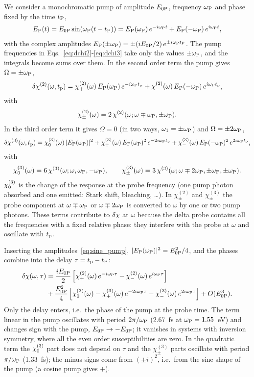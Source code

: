 \documentclass[10pt,a4paper]{paper}
\begin{document}
We consider a monochromatic pump of amplitude $E_{0\mathrm{P}}$, frequency $\omega_{\mathrm{P}}$ and phase fixed by the time $t_{\mathrm{P}}$,
\begin{equation}
E_{\mathrm{P}}(t) = E_{0\mathrm{P}}\sin(\omega_{\mathrm{P}}(t-t_{\mathrm{P}})) = E_{\mathrm{P}}(\omega_{\mathrm{P}})\,e^{-i\omega_{\mathrm{P}} t}+E_{\mathrm{P}}(-\omega_{\mathrm{P}})\,e^{i\omega_{\mathrm{P}} t} ,
\label{eq:sine_pump}
\end{equation}
with the complex amplitudes $E_{\mathrm{P}}(\pm\omega_{\mathrm{P}}) = \pm(iE_{0\mathrm{P}}/2)\,e^{\pm i\omega_{\mathrm{P}}t_{\mathrm{P}}}$. The pump frequencies in Eqs.~\eqref{eq:dchi2}-\eqref{eq:dchi3} take only the values $\pm\omega_{\mathrm{P}}$, and the integrals become
sums over them. In the second order term the pump gives $\Omega = \pm\omega_{\mathrm{P}}$,
\begin{equation}
\delta\chi^{(2)}(\omega,t_{\mathrm{p}}) = \chi^{(2)}_+(\omega)\,E_{\mathrm{P}}(\omega_{\mathrm{P}})\,e^{-i\omega_{\mathrm{P}}t_{\mathrm{p}}} + \chi^{(2)}_-(\omega)\,E_{\mathrm{P}}(-\omega_{\mathrm{P}})\,e^{i\omega_{\mathrm{P}}t_{\mathrm{p}}} ,
\label{eq:dchi2_mono}
\end{equation}
with
\begin{equation}
\chi^{(2)}_\pm(\omega) = 2\,\chi^{(2)}(\omega;\omega\mp\omega_{\mathrm{P}},\pm\omega_{\mathrm{P}}) .
\label{eq:chi2_mono}
\end{equation}
In the third order term it gives $\Omega = 0$ (in two ways, $\omega_1 = \pm\omega_{\mathrm{P}}$) and $\Omega = \pm2\omega_{\mathrm{P}}$,
\begin{equation}
\delta\chi^{(3)}(\omega,t_{\mathrm{p}}) = \chi^{(3)}_{0}(\omega)\,|E_{\mathrm{P}}(\omega_{\mathrm{P}})|^2 + \chi^{(3)}_{+}(\omega)\,E_{\mathrm{P}}(\omega_{\mathrm{P}})^2\,e^{-2i\omega_{\mathrm{P}}t_{\mathrm{p}}}
+ \chi^{(3)}_{-}(\omega)\,E_{\mathrm{P}}(-\omega_{\mathrm{P}})^2\,e^{2i\omega_{\mathrm{P}}t_{\mathrm{p}}} ,
\label{eq:dchi3_mono}
\end{equation}
with
\begin{equation}
\chi^{(3)}_{0}(\omega) = 6\,\chi^{(3)}(\omega;\omega,\omega_{\mathrm{P}},-\omega_{\mathrm{P}}) , \qquad
\chi^{(3)}_{\pm}(\omega) = 3\,\chi^{(3)}(\omega;\omega\mp2\omega_{\mathrm{P}},\pm\omega_{\mathrm{P}},\pm\omega_{\mathrm{P}}) .
\label{eq:chi3_mono}
\end{equation}
$\chi^{(3)}_{0}$ is the change of the response at the probe frequency (one pump photon absorbed and one emitted: Stark shift,
bleaching, \dots). In $\chi^{(2)}_\pm$ and $\chi^{(3)}_\pm$ the probe component at $\omega\mp\omega_{\mathrm{P}}$ or $\omega\mp2\omega_{\mathrm{P}}$ is
converted to $\omega$ by one or two pump photons. These terms contribute to $\delta\chi$ at $\omega$ because the delta probe
contains all the frequencies with a fixed relative phase: they interfere with the probe at $\omega$ and oscillate with
$t_{\mathrm{p}}$.

Inserting the amplitudes~\eqref{eq:sine_pump}, $|E_{\mathrm{P}}(\omega_{\mathrm{P}})|^2 = E_{0\mathrm{P}}^2/4$, and the phases combine into the delay
$\tau = t_{\mathrm{p}}-t_{\mathrm{P}}$:
\begin{align}
\delta\chi(\omega,\tau) &= \frac{iE_{0\mathrm{P}}}{2}\left[\chi^{(2)}_+(\omega)\,e^{-i\omega_{\mathrm{P}}\tau} - \chi^{(2)}_-(\omega)\,e^{i\omega_{\mathrm{P}}\tau}\right]
\nonumber\\
&+ \frac{E_{0\mathrm{P}}^2}{4}\left[\chi^{(3)}_{0}(\omega) - \chi^{(3)}_{+}(\omega)\,e^{-2i\omega_{\mathrm{P}}\tau} - \chi^{(3)}_{-}(\omega)\,e^{2i\omega_{\mathrm{P}}\tau}\right]
+ O(E_{0\mathrm{P}}^3) .
\label{eq:dchi_mono}
\end{align}
Only the delay enters, i.e.\ the phase of the pump at the probe time. The term linear in the pump oscillates with
period $2\pi/\omega_{\mathrm{P}}$ (2.67~fs at $\omega_{\mathrm{P}} = 1.55$~eV) and changes sign with the pump, $E_{0\mathrm{P}}\to-E_{0\mathrm{P}}$; it vanishes in systems
with inversion symmetry, where all the even order susceptibilities are zero. In the quadratic term the $\chi^{(3)}_{0}$ part does
not depend on $\tau$ and the $\chi^{(3)}_\pm$ parts oscillate with period $\pi/\omega_{\mathrm{P}}$ (1.33~fs); the minus signs come
from $(\pm i)^2$, i.e.\ from the sine shape of the pump (a cosine pump gives $+$).
\end{document}

